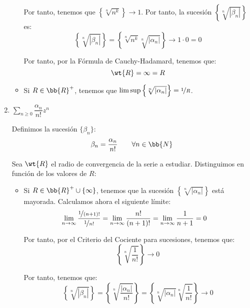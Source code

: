 \begin{ejercicio}
\begin{enumerate}
\begin{itemize}
            Por tanto, tenemos que $\left\{\sqrt[n]{n^k}\right\}\to 1$. Por tanto, la sucesión $\left\{\sqrt[n]{|\beta_n|}\right\}$ es:
            \begin{equation*}
                \left\{\sqrt[n]{|\beta_n|}\right\} = \left\{\sqrt[n]{n^k}\sqrt[n]{|\alpha_n|}\right\}\to 1\cdot 0 = 0
            \end{equation*}

            Por tanto, por la Fórmula de Cauchy-Hadamard, tenemos que:
            \begin{equation*}
                \wt{R} = \infty = R
            \end{equation*}

            \item Si $R\in \bb{R}^+$, tenemos que $\limsup\left\{\sqrt[n]{|\alpha_n|}\right\} = \nicefrac{1}{R}$.
            

        \end{itemize}

        \item $\displaystyle \sum_{n \geq 0} \dfrac{\alpha_n}{n!}z^n$
        
        Definimos la sucesión $\{\beta_n\}$:
        \[
            \beta_n = \dfrac{\alpha_n}{n!}\qquad \forall n\in \bb{N}
        \]

        Sea $\wt{R}$ el radio de convergencia de la serie a estudiar. Distinguimos en función de los valores de $R$:
        \begin{itemize}
            \item Si $R\in \bb{R}^+\cup \{\infty\}$, tenemos que la sucesión $\left\{\sqrt[n]{|\alpha_n|}\right\}$ está mayorada. Calculamos ahora el siguiente límite:
            \begin{align*}
                \lim_{n \to \infty} \dfrac{\nicefrac{1}{(n+1)!}}{\nicefrac{1}{n!}}
                &= \lim_{n \to \infty} \dfrac{n!}{(n+1)!}
                = \lim_{n \to \infty} \dfrac{1}{n+1} = 0
            \end{align*}

            Por tanto, por el Criterio del Cociente para sucesiones, tenemos que:
            \begin{equation*}
                \left\{\sqrt[n]{\dfrac{1}{n!}}\right\}\to 0
            \end{equation*}

            Por tanto, tenemos que:
            \begin{equation*}
                \left\{\sqrt[n]{|\beta_n|}\right\} = \left\{\sqrt[n]{\dfrac{|\alpha_n|}{n!}}\right\}
                = \left\{\sqrt[n]{|\alpha_n|}\sqrt[n]{\dfrac{1}{n!}}\right\}\to 0
            \end{equation*}


\end{itemize}
\end{enumerate}
\end{ejercicio}
